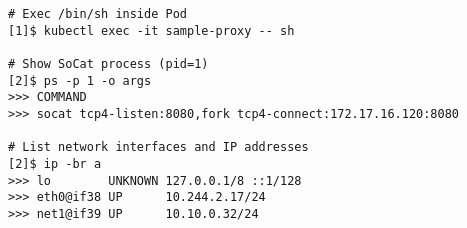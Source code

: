 \begin{lstfloat}
\begin{lstlisting}[style=mybashstyle,
caption={Ukázka nastavení proxy Podu},
label={code:proxyValid}
]
# Exec /bin/sh inside Pod
[1]$ kubectl exec -it sample-proxy -- sh

# Show SoCat process (pid=1)
[2]$ ps -p 1 -o args
>>> COMMAND
>>> socat tcp4-listen:8080,fork tcp4-connect:172.17.16.120:8080

# List network interfaces and IP addresses
[2]$ ip -br a
>>> lo        UNKNOWN 127.0.0.1/8 ::1/128 
>>> eth0@if38 UP      10.244.2.17/24
>>> net1@if39 UP      10.10.0.32/24
\end{lstlisting}
\end{lstfloat}
